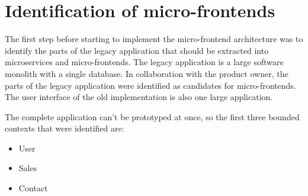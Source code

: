 \section{Identification of micro-frontends}\label{section:applied-methods:identification-micro-frontends}

The first step before starting to implement the micro-frontend architecture was to identify the parts of the legacy application that should be extracted into microservices and micro-frontends. The legacy application is a large software monolith with a single database. In collaboration with the product owner, the parts of the legacy application were identified as candidates for micro-frontends. The user interface of the old implementation is also one large application.

\bigskip

\noindent The complete application can't be prototyped at once, so the first three bounded contexts that were identified are:

\begin{itemize}
  \item User
  \item Sales
  \item Contact
\end{itemize}